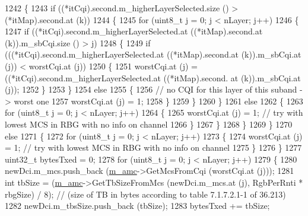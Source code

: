 \begin{DoxyCode}
1242             \{
1243               \textcolor{keywordflow}{if} ((*itCqi).second.m\_higherLayerSelected.size () > (*itMap).second.at (k))
1244                 \{
1245                   \textcolor{keywordflow}{for} (uint8\_t j = 0; j < nLayer; j++)
1246                     \{
1247                       \textcolor{keywordflow}{if} ((*itCqi).second.m\_higherLayerSelected.at ((*itMap).second.at (k)).m\_sbCqi.size ()
       > j)
1248                         \{
1249                           \textcolor{keywordflow}{if} (((*itCqi).second.m\_higherLayerSelected.at ((*itMap).second.at (k)).m\_sbCqi.at
       (j)) < worstCqi.at (j))
1250                             \{
1251                               worstCqi.at (j) = ((*itCqi).second.m\_higherLayerSelected.at ((*itMap).second.
      at (k)).m\_sbCqi.at (j));
1252                             \}
1253                         \}
1254                       \textcolor{keywordflow}{else}
1255                         \{
1256                           \textcolor{comment}{// no CQI for this layer of this suband -> worst one}
1257                           worstCqi.at (j) = 1;
1258                         \}
1259                     \}
1260                 \}
1261               \textcolor{keywordflow}{else}
1262                 \{
1263                   \textcolor{keywordflow}{for} (uint8\_t j = 0; j < nLayer; j++)
1264                     \{
1265                       worstCqi.at (j) = 1; \textcolor{comment}{// try with lowest MCS in RBG with no info on channel}
1266                     \}
1267                 \}
1268             \}
1269         \}
1270       \textcolor{keywordflow}{else}
1271         \{
1272           \textcolor{keywordflow}{for} (uint8\_t j = 0; j < nLayer; j++)
1273             \{
1274               worstCqi.at (j) = 1; \textcolor{comment}{// try with lowest MCS in RBG with no info on channel}
1275             \}
1276         \}
1277       uint32\_t bytesTxed = 0;
1278       \textcolor{keywordflow}{for} (uint8\_t j = 0; j < nLayer; j++)
1279         \{
1280           newDci.m\_mcs.push\_back (\hyperlink{classns3_1_1TdTbfqFfMacScheduler_a42e469f5ce9e3e079123f5c9a60fe7c4}{m\_amc}->GetMcsFromCqi (worstCqi.at (j)));
1281           \textcolor{keywordtype}{int} tbSize = (\hyperlink{classns3_1_1TdTbfqFfMacScheduler_a42e469f5ce9e3e079123f5c9a60fe7c4}{m\_amc}->GetTbSizeFromMcs (newDci.m\_mcs.at (j), RgbPerRnti * rbgSize) / 8); \textcolor{comment}{//
       (size of TB in bytes according to table 7.1.7.2.1-1 of 36.213) }
1282           newDci.m\_tbsSize.push\_back (tbSize);
1283           bytesTxed += tbSize;

\end{DoxyCode}

